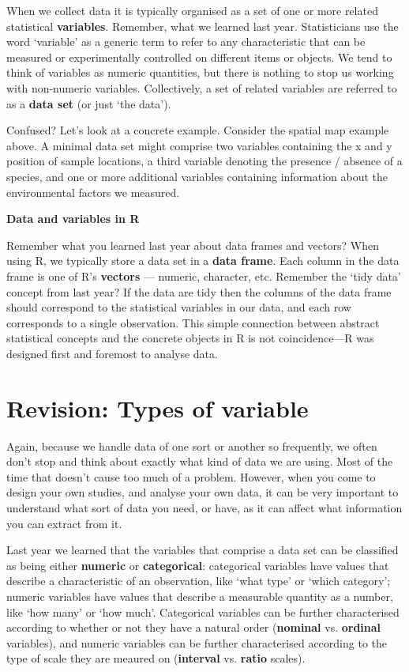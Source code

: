 \documentclass[]{book}
\begin{document}
When we collect data it is typically organised as a set of one or more
related statistical \textbf{variables}. Remember, what we learned last
year. Statisticians use the word `variable' as a generic term to refer
to any characteristic that can be measured or experimentally controlled
on different items or objects. We tend to think of variables as numeric
quantities, but there is nothing to stop us working with non-numeric
variables. Collectively, a set of related variables are referred to as a
\textbf{data set} (or just `the data').

Confused? Let's look at a concrete example. Consider the spatial map
example above. A minimal data set might comprise two variables
containing the x and y position of sample locations, a third variable
denoting the presence / absence of a species, and one or more additional
variables containing information about the environmental factors we
measured.

\begin{advanced-box}
\textbf{Data and variables in R}

Remember what you learned last year about data frames and vectors? When
using R, we typically store a data set in a \textbf{data frame}. Each
column in the data frame is one of R's \textbf{vectors} --- numeric,
character, etc. Remember the `tidy data' concept from last year? If the
data are tidy then the columns of the data frame should correspond to
the statistical variables in our data, and each row corresponds to a
single observation. This simple connection between abstract statistical
concepts and the concrete objects in R is not coincidence---R was
designed first and foremost to analyse data.
\end{advanced-box}

\section{Revision: Types of variable}\label{var-types}

Again, because we handle data of one sort or another so frequently, we
often don't stop and think about exactly what kind of data we are using.
Most of the time that doesn't cause too much of a problem. However, when
you come to design your own studies, and analyse your own data, it can
be very important to understand what sort of data you need, or have, as
it can affect what information you can extract from it.

Last year we learned that the variables that comprise a data set can be
classified as being either \textbf{numeric} or \textbf{categorical}:
categorical variables have values that describe a characteristic of an
observation, like `what type' or `which category'; numeric variables
have values that describe a measurable quantity as a number, like `how
many' or `how much'. Categorical variables can be further characterised
according to whether or not they have a natural order (\textbf{nominal}
vs. \textbf{ordinal} variables), and numeric variables can be further
characterised according to the type of scale they are meaured on
(\textbf{interval} vs. \textbf{ratio} scales).
\end{document}

